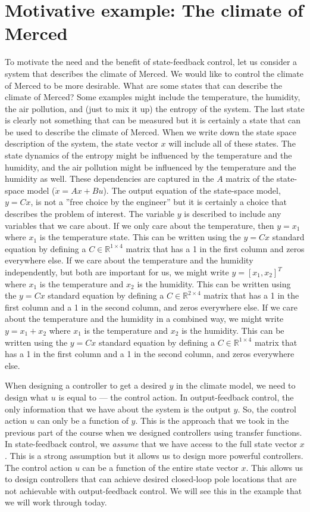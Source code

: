 \documentclass{ee122_notes}
\begin{document}
\section{Motivative example: The climate of Merced}
To motivate the need and the benefit of state-feedback control, let us consider a system that describes the climate of Merced. We would like to control the climate of Merced to be more desirable. What are some states that can describe the climate of Merced? Some examples might include the temperature, the humidity, the air pollution, and (just to mix it up) the entropy of the system. The last state is clearly not something that can be measured but it is certainly a state that can be used to describe the climate of Merced. When we write down the state space description of the system, the state vector $x$ will include all of these states. The state dynamics of the entropy might be influenced by the temperature and the humidity, and the air pollution might be influenced by the temperature and the humidity as well. These dependencies are captured in the $A$ matrix of the state-space model ($\dot x = Ax + Bu$). The output equation of the state-space model, $y = Cx$, is not a ''free choice by the engineer'' but it is certainly a choice that describes the problem of interest. The variable $y$ is described to include any variables that we care about. If we only care about the temperature, then $y = x_1$ where $x_1$ is the temperature state. This can be written using the $y = Cx$ standard equation by defining a $C \in \mathbb{R}^{1 \times 4}$ matrix that has a 1 in the first column and zeros everywhere else. If we care about the temperature and the humidity independently, but both are important for us, we might write $y = [x_1, x_2]^T$ where $x_1$ is the temperature and $x_2$ is the humidity. This can be written using the $y = Cx$ standard equation by defining a $C \in \mathbb{R}^{2 \times 4}$ matrix that has a 1 in the first column and a 1 in the second column, and zeros everywhere else. If we care about the temperature and the humidity in a combined way, we might write $y = x_1 + x_2$ where $x_1$ is the temperature and $x_2$ is the humidity. This can be written using the $y = Cx$ standard equation by defining a $C \in \mathbb{R}^{1 \times 4}$ matrix that has a 1 in the first column and a 1 in the second column, and zeros everywhere else. 

When designing a controller to get a desired $y$ in the climate model, we need to design what $u$ is equal to --- the control action. In output-feedback control, the only information that we have about the system is the output $y$. So, the control action $u$ can only be a function of $y$. This is the approach that we took in the previous part of the course when we designed controllers using transfer functions. In state-feedback control, we \textit{assume} that we have access to the full state vector $x$. This is a strong assumption but it allows us to design more powerful controllers. The control action $u$ can be a function of the entire state vector $x$. This allows us to design controllers that can achieve desired closed-loop pole locations that are not achievable with output-feedback control. We will see this in the example that we will work through today.
\end{document}
